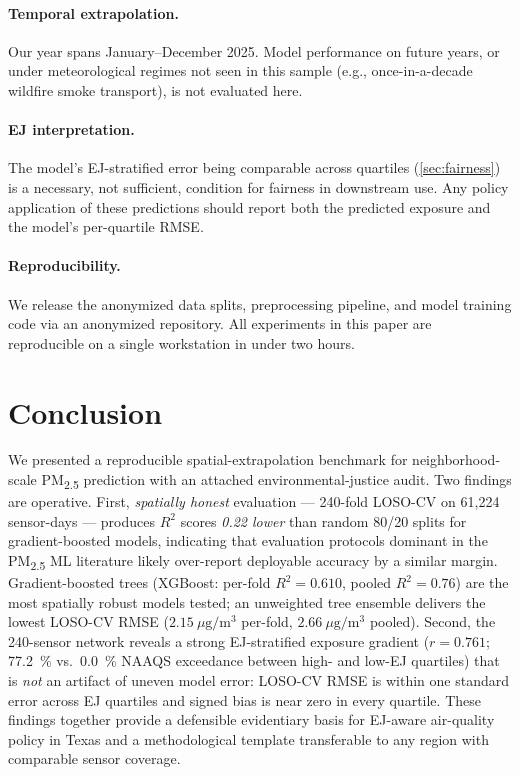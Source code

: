 \documentclass{article}
\begin{document}
\paragraph{Temporal extrapolation.} Our year spans January--December 2025. Model performance on future years, or under meteorological regimes not seen in this sample (e.g., once-in-a-decade wildfire smoke transport), is not evaluated here.

\paragraph{EJ interpretation.} The model's EJ-stratified error being comparable across quartiles (\autoref{sec:fairness}) is a necessary, not sufficient, condition for fairness in downstream use. Any policy application of these predictions should report both the predicted exposure and the model's per-quartile RMSE.

\paragraph{Reproducibility.} We release the anonymized data splits, preprocessing pipeline, and model training code via an anonymized repository. All experiments in this paper are reproducible on a single workstation in under two hours.

\section{Conclusion}

We presented a reproducible spatial-extrapolation benchmark for neighborhood-scale PM\textsubscript{2.5} prediction with an attached environmental-justice audit. Two findings are operative. First, \emph{spatially honest} evaluation --- 240-fold LOSO-CV on 61{,}224 sensor-days --- produces $R^2$ scores \emph{0.22 lower} than random 80/20 splits for gradient-boosted models, indicating that evaluation protocols dominant in the PM\textsubscript{2.5} ML literature likely over-report deployable accuracy by a similar margin. Gradient-boosted trees (XGBoost: per-fold $R^2=0.610$, pooled $R^2=0.76$) are the most spatially robust models tested; an unweighted tree ensemble delivers the lowest LOSO-CV RMSE ($2.15~\mu\mathrm{g}/\mathrm{m}^3$ per-fold, $2.66~\mu\mathrm{g}/\mathrm{m}^3$ pooled). Second, the 240-sensor network reveals a strong EJ-stratified exposure gradient ($r=0.761$; \SI{77.2}{\percent} vs.\ \SI{0.0}{\percent} NAAQS exceedance between high- and low-EJ quartiles) that is \emph{not} an artifact of uneven model error: LOSO-CV RMSE is within one standard error across EJ quartiles and signed bias is near zero in every quartile. These findings together provide a defensible evidentiary basis for EJ-aware air-quality policy in Texas and a methodological template transferable to any region with comparable sensor coverage.
\end{document}
